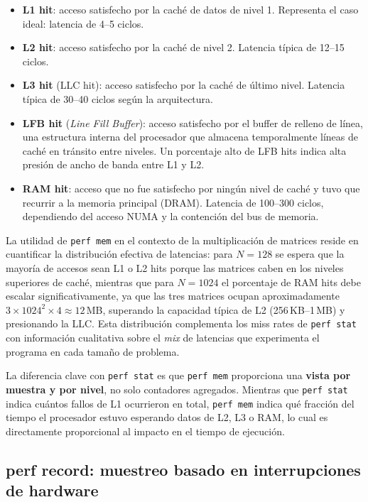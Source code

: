 \begin{itemize}
    \item \textbf{L1 hit}: acceso satisfecho por la caché de datos de nivel 1.
        Representa el caso ideal: latencia de 4--5 ciclos.
    \item \textbf{L2 hit}: acceso satisfecho por la caché de nivel 2.
        Latencia típica de 12--15 ciclos.
    \item \textbf{L3 hit} (LLC hit): acceso satisfecho por la caché de último
        nivel.
        Latencia típica de 30--40 ciclos según la arquitectura.
    \item \textbf{LFB hit} (\textit{Line Fill Buffer}): acceso satisfecho por
        el buffer de relleno de línea, una estructura interna del procesador que
        almacena temporalmente líneas de caché en tránsito entre niveles.
        Un porcentaje alto de LFB hits indica alta presión de ancho de banda
        entre L1 y L2.
    \item \textbf{RAM hit}: acceso que no fue satisfecho por ningún nivel de
        caché y tuvo que recurrir a la memoria principal (DRAM).
        Latencia de 100--300 ciclos, dependiendo del acceso NUMA y la
        contención del bus de memoria.
\end{itemize}

La utilidad de \texttt{perf mem} en el contexto de la multiplicación de matrices
reside en cuantificar la distribución efectiva de latencias: para
$N = 128$ se espera que la mayoría de accesos sean L1 o L2 hits porque las
matrices caben en los niveles superiores de caché, mientras que para $N = 1024$
el porcentaje de RAM hits debe escalar significativamente, ya que las tres
matrices ocupan aproximadamente $3 \times 1024^2 \times 4 \approx 12$\,MB,
superando la capacidad típica de L2 (256\,KB--1\,MB) y presionando la LLC.
Esta distribución complementa los miss rates de \texttt{perf stat} con
información cualitativa sobre el \textit{mix} de latencias que experimenta el
programa en cada tamaño de problema.

La diferencia clave con \texttt{perf stat} es que \texttt{perf mem} proporciona
una \textbf{vista por muestra y por nivel}, no solo contadores agregados.
Mientras que \texttt{perf stat} indica cuántos fallos de L1 ocurrieron en total,
\texttt{perf mem} indica qué fracción del tiempo el procesador estuvo esperando
datos de L2, L3 o RAM, lo cual es directamente proporcional al impacto en el
tiempo de ejecución.

\subsection{perf record: muestreo basado en interrupciones de hardware}

